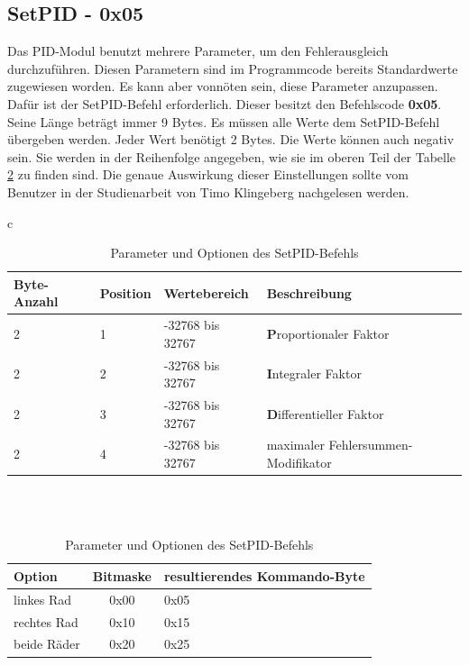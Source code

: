 \subsection{SetPID - 0x05}
Das PID-Modul benutzt mehrere Parameter, um den Fehlerausgleich durchzuführen. Diesen
Parametern sind im Programmcode bereits Standardwerte zugewiesen worden. Es kann aber
vonnöten sein, diese Parameter anzupassen. Dafür ist der SetPID-Befehl erforderlich.
Dieser besitzt den Befehlscode \textbf{0x05}. Seine Länge beträgt immer 9 Bytes. Es müssen
alle Werte dem SetPID-Befehl übergeben werden. Jeder Wert benötigt 2 Bytes.
Die Werte können auch negativ sein. Sie werden in der Reihenfolge angegeben,
wie sie im oberen Teil der Tabelle \ref{protocol_setpid} zu finden sind.
Die genaue Auswirkung dieser Einstellungen sollte vom Benutzer in der Studienarbeit von
Timo Klingeberg \cite{STUD_TIMO} nachgelesen werden.
\begin{table}[htb]
\begin{center}
	\begin{tabular}{c}
	\begin{tabularx}{\linewidth}{|l|l|l|X|}
		\hline
		\textbf{Byte-Anzahl} & \textbf{Position} & \textbf{Wertebereich} & \textbf{Beschreibung} \\
		\hline
		\hline
		2					 & 1 & -32768 bis 32767 & \textbf{P}roportionaler Faktor\\
		\hline
		2					 & 2 & -32768 bis 32767 & \textbf{I}ntegraler Faktor\\
		\hline
		2					 & 3 & -32768 bis 32767 & \textbf{D}ifferentieller Faktor\\
		\hline
		2					 & 4 & -32768 bis 32767 & maximaler Fehlersummen-Modifikator\\
		\hline
	\end{tabularx}\\
	\\
	\begin{tabularx}{\linewidth}{|l|c|X|}
		\hline
		\textbf{Option} & \textbf{Bitmaske} & \textbf{resultierendes Kommando-Byte} \\
		\hline
		\hline
		linkes Rad	& 0x00 & 0x05 \\
		\hline
		rechtes Rad	& 0x10 & 0x15 \\
		\hline
		beide Räder & 0x20 & 0x25 \\
		\hline
	\end{tabularx}
	\end{tabular}
	\caption{\label{protocol_setpid} Parameter und Optionen des SetPID-Befehls}
\end{center}
\end{table}

